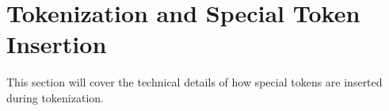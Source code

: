 \section{Tokenization and Special Token Insertion}
This section will cover the technical details of how special tokens are inserted during tokenization.